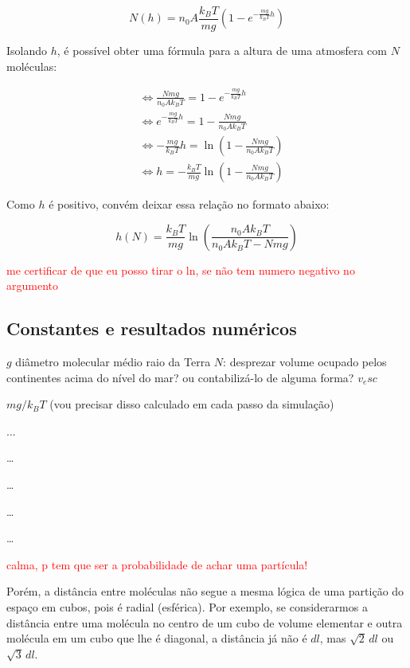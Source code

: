 \documentclass[12pt]{extarticle} %
\begin{document}
$$N(h)= n_0A\frac{k_BT}{mg}\left(1-e^{-\frac{mg}{k_BT}h}\right)$$

Isolando $h$, é possível obter uma fórmula para a altura de uma atmosfera com $N$ moléculas:

\begin{align*}
    &\Leftrightarrow \frac{Nmg}{n_0Ak_BT} = 1 - e^{-\frac{mg}{k_BT}h} \\
    &\Leftrightarrow e^{-\frac{mg}{k_BT}h} = 1 -  \frac{Nmg}{n_0Ak_BT} \\
    &\Leftrightarrow -\frac{mg}{k_BT}h = \ln\left(1 -  \frac{Nmg}{n_0Ak_BT}\right) \\
    &\Leftrightarrow h = -\frac{k_BT}{mg}\ln\left(1 -  \frac{Nmg}{n_0Ak_BT}\right)
\end{align*}

Como $h$ é positivo, convém deixar essa relação no formato abaixo:

\begin{equation}
    \boxed{
        \, \, h(N)=\frac{k_BT}{mg}\ln\left(\frac{n_0Ak_BT}{n_0Ak_BT-Nmg}\right) \,\,
    }
\end{equation}

\textcolor{red}{me certificar de que eu posso tirar o ln, se não tem numero negativo no argumento}

\subsection{Constantes e resultados numéricos}

$g$
diâmetro molecular médio
raio da Terra
$N$: desprezar volume ocupado pelos continentes acima do nível do mar? ou contabilizá-lo de alguma forma?
$v_esc$

$mg/k_BT$ (vou precisar disso calculado em cada passo da simulação)







...


\dots

\dots

\dots

\dots


\textcolor{red}{calma, p tem que ser a probabilidade de achar uma partícula!}

Porém, a distância entre moléculas não segue a mesma lógica de uma partição do espaço em cubos, pois é radial (esférica). Por exemplo, se considerarmos a distância entre uma molécula no centro de um cubo de volume elementar e outra molécula em um cubo que lhe é diagonal, a distância já não é $dl$, mas $\sqrt{2}\,dl$ ou $\sqrt{3}\, dl$.
\end{document}
